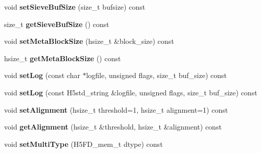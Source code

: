 \begin{DoxyCompactItemize}
\item 
\mbox{\label{class_h5_1_1_file_acc_prop_list_a00064f32aea2943cbf3743b8aabdde33}} 
void {\bfseries set\+Sieve\+Buf\+Size} (size\+\_\+t bufsize) const
\item 
\mbox{\label{class_h5_1_1_file_acc_prop_list_a5fc1a9224b17dc4f3fe68b9d1475d26d}} 
size\+\_\+t {\bfseries get\+Sieve\+Buf\+Size} () const
\item 
\mbox{\label{class_h5_1_1_file_acc_prop_list_abd4a20b6b9397a4aa467a23644d91129}} 
void {\bfseries set\+Meta\+Block\+Size} (hsize\+\_\+t \&block\+\_\+size) const
\item 
\mbox{\label{class_h5_1_1_file_acc_prop_list_a4bc35992eaf18dd313ab1c0abae968f1}} 
hsize\+\_\+t {\bfseries get\+Meta\+Block\+Size} () const
\item 
\mbox{\label{class_h5_1_1_file_acc_prop_list_abf0db259d93fe6a0c1b2cdac031a9d13}} 
void {\bfseries set\+Log} (const char $\ast$logfile, unsigned flags, size\+\_\+t buf\+\_\+size) const
\item 
\mbox{\label{class_h5_1_1_file_acc_prop_list_adc69c718f00f7d164a01aeefa519a140}} 
void {\bfseries set\+Log} (const H5std\+\_\+string \&logfile, unsigned flags, size\+\_\+t buf\+\_\+size) const
\item 
\mbox{\label{class_h5_1_1_file_acc_prop_list_a4bb1a9fa53ef7cd437416d472e9f6e18}} 
void {\bfseries set\+Alignment} (hsize\+\_\+t threshold=1, hsize\+\_\+t alignment=1) const
\item 
\mbox{\label{class_h5_1_1_file_acc_prop_list_a26ce3c7455559229481b61a27f746bc3}} 
void {\bfseries get\+Alignment} (hsize\+\_\+t \&threshold, hsize\+\_\+t \&alignment) const
\item 
\mbox{\label{class_h5_1_1_file_acc_prop_list_a2f4b907e631fde5a601538da442a45b5}} 
void {\bfseries set\+Multi\+Type} (H5\+F\+D\+\_\+mem\+\_\+t dtype) const
\item 

\end{DoxyCompactItemize}
